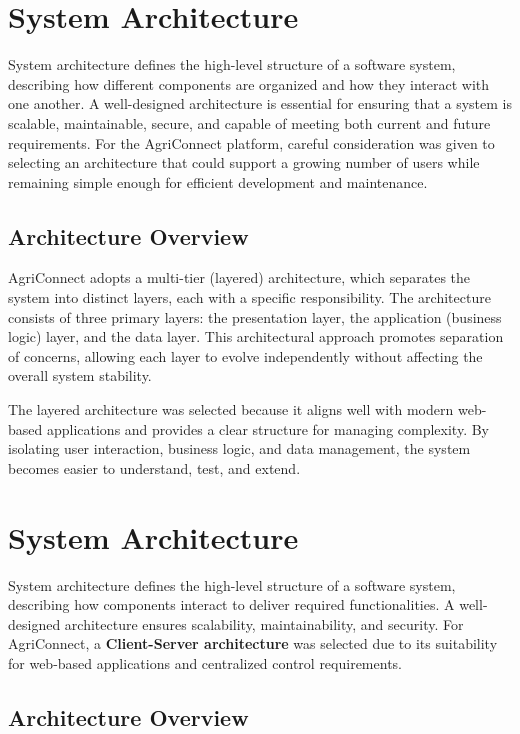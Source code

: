 \documentclass[12pt,a4paper]{article}
\begin{document}
\section{System Architecture}

System architecture defines the high-level structure of a software system, describing how different components are organized and how they interact with one another. A well-designed architecture is essential for ensuring that a system is scalable, maintainable, secure, and capable of meeting both current and future requirements. For the AgriConnect platform, careful consideration was given to selecting an architecture that could support a growing number of users while remaining simple enough for efficient development and maintenance.

\subsection{Architecture Overview}

AgriConnect adopts a multi-tier (layered) architecture, which separates the system into distinct layers, each with a specific responsibility. The architecture consists of three primary layers: the presentation layer, the application (business logic) layer, and the data layer. This architectural approach promotes separation of concerns, allowing each layer to evolve independently without affecting the overall system stability.

The layered architecture was selected because it aligns well with modern web-based applications and provides a clear structure for managing complexity. By isolating user interaction, business logic, and data management, the system becomes easier to understand, test, and extend.

\section{System Architecture}

System architecture defines the high-level structure of a software system, describing how components interact to deliver required functionalities. A well-designed architecture ensures scalability, maintainability, and security. For AgriConnect, a \textbf{Client-Server architecture} was selected due to its suitability for web-based applications and centralized control requirements.

\subsection{Architecture Overview}
\end{document}
